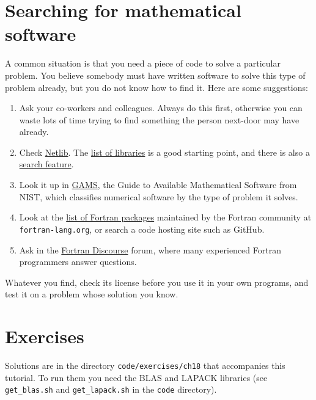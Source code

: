 \section{Searching for mathematical software}

A common situation is that you need a piece of code to solve a particular problem. You believe somebody must have written software to solve this type of problem already, but you do not know how to find it. Here are some suggestions:

\begin{enumerate}
    \item Ask your co-workers and colleagues. Always do this first, otherwise you can waste lots of time trying to find something the person next-door may have already.
    \item Check \href{https://www.netlib.org/}{Netlib}. The \href{https://www.netlib.org/liblist.html}{list of libraries} is a good starting point, and there is also a \href{https://www.netlib.org/utk/misc/netlib_query.html}{search feature}.
    \item Look it up in \href{https://gams.nist.gov/}{GAMS}, the Guide to Available Mathematical Software from NIST, which classifies numerical software by the type of problem it solves.
    \item Look at the \href{https://fortran-lang.org/packages/}{list of Fortran packages} maintained by the Fortran community at \texttt{fortran-lang.org}, or search a code hosting site such as GitHub.
    \item Ask in the \href{https://fortran-lang.discourse.group}{Fortran Discourse} forum, where many experienced Fortran programmers answer questions.
\end{enumerate}

Whatever you find, check its license before you use it in your own programs, and test it on a problem whose solution you know.

\section{Exercises}

Solutions are in the directory \texttt{code/exercises/ch18} that accompanies this tutorial. To run them you need the BLAS and LAPACK libraries (see \texttt{get\_blas.sh} and \texttt{get\_lapack.sh} in the \texttt{code} directory).


